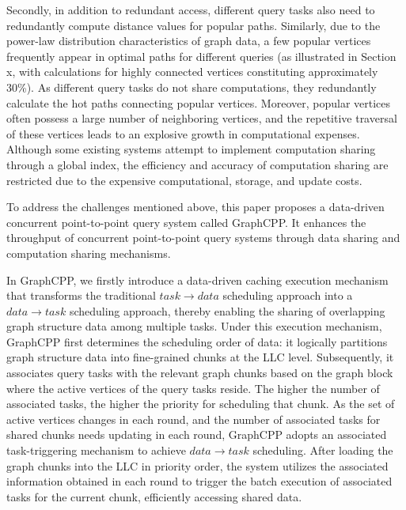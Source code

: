\documentclass[lettersize,journal]{IEEEtran} %
\begin{document}
Secondly, in addition to redundant access, different query tasks also need to redundantly compute distance values for popular paths. Similarly, due to the power-law distribution characteristics of graph data, a few popular vertices frequently appear in optimal paths for different queries (as illustrated in Section x, with calculations for highly connected vertices constituting approximately 30\%). As different query tasks do not share computations, they redundantly calculate the hot paths connecting popular vertices. Moreover, popular vertices often possess a large number of neighboring vertices, and the repetitive traversal of these vertices leads to an explosive growth in computational expenses. Although some existing systems attempt to implement computation sharing through a global index\cite{tripoline}\cite{sgraph}, the efficiency and accuracy of computation sharing are restricted due to the expensive computational, storage, and update costs.

To address the challenges mentioned above, this paper proposes a data-driven concurrent point-to-point query system called GraphCPP. It enhances the throughput of concurrent point-to-point query systems through data sharing and computation sharing mechanisms.

In GraphCPP, we firstly introduce a data-driven caching execution mechanism that transforms the traditional $task \rightarrow data$ scheduling approach into a $data \rightarrow task$ scheduling approach, thereby enabling the sharing of overlapping graph structure data among multiple tasks. Under this execution mechanism, GraphCPP first determines the scheduling order of data: it logically partitions graph structure data into fine-grained chunks at the LLC level. Subsequently, it associates query tasks with the relevant graph chunks based on the graph block where the active vertices of the query tasks reside. The higher the number of associated tasks, the higher the priority for scheduling that chunk. As the set of active vertices changes in each round, and the number of associated tasks for shared chunks needs updating in each round, GraphCPP adopts an associated task-triggering mechanism to achieve $data \rightarrow task$ scheduling. After loading the graph chunks into the LLC in priority order, the system utilizes the associated information obtained in each round to trigger the batch execution of associated tasks for the current chunk, efficiently accessing shared data.
\end{document}
